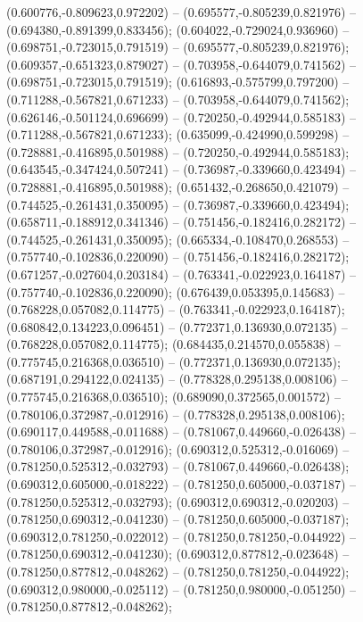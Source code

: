  (0.600776,-0.809623,0.972202) -- (0.695577,-0.805239,0.821976) -- (0.694380,-0.891399,0.833456);
 (0.604022,-0.729024,0.936960) -- (0.698751,-0.723015,0.791519) -- (0.695577,-0.805239,0.821976);
 (0.609357,-0.651323,0.879027) -- (0.703958,-0.644079,0.741562) -- (0.698751,-0.723015,0.791519);
 (0.616893,-0.575799,0.797200) -- (0.711288,-0.567821,0.671233) -- (0.703958,-0.644079,0.741562);
 (0.626146,-0.501124,0.696699) -- (0.720250,-0.492944,0.585183) -- (0.711288,-0.567821,0.671233);
 (0.635099,-0.424990,0.599298) -- (0.728881,-0.416895,0.501988) -- (0.720250,-0.492944,0.585183);
 (0.643545,-0.347424,0.507241) -- (0.736987,-0.339660,0.423494) -- (0.728881,-0.416895,0.501988);
 (0.651432,-0.268650,0.421079) -- (0.744525,-0.261431,0.350095) -- (0.736987,-0.339660,0.423494);
 (0.658711,-0.188912,0.341346) -- (0.751456,-0.182416,0.282172) -- (0.744525,-0.261431,0.350095);
 (0.665334,-0.108470,0.268553) -- (0.757740,-0.102836,0.220090) -- (0.751456,-0.182416,0.282172);
 (0.671257,-0.027604,0.203184) -- (0.763341,-0.022923,0.164187) -- (0.757740,-0.102836,0.220090);
 (0.676439,0.053395,0.145683) -- (0.768228,0.057082,0.114775) -- (0.763341,-0.022923,0.164187);
 (0.680842,0.134223,0.096451) -- (0.772371,0.136930,0.072135) -- (0.768228,0.057082,0.114775);
 (0.684435,0.214570,0.055838) -- (0.775745,0.216368,0.036510) -- (0.772371,0.136930,0.072135);
 (0.687191,0.294122,0.024135) -- (0.778328,0.295138,0.008106) -- (0.775745,0.216368,0.036510);
 (0.689090,0.372565,0.001572) -- (0.780106,0.372987,-0.012916) -- (0.778328,0.295138,0.008106);
 (0.690117,0.449588,-0.011688) -- (0.781067,0.449660,-0.026438) -- (0.780106,0.372987,-0.012916);
 (0.690312,0.525312,-0.016069) -- (0.781250,0.525312,-0.032793) -- (0.781067,0.449660,-0.026438);
 (0.690312,0.605000,-0.018222) -- (0.781250,0.605000,-0.037187) -- (0.781250,0.525312,-0.032793);
 (0.690312,0.690312,-0.020203) -- (0.781250,0.690312,-0.041230) -- (0.781250,0.605000,-0.037187);
 (0.690312,0.781250,-0.022012) -- (0.781250,0.781250,-0.044922) -- (0.781250,0.690312,-0.041230);
 (0.690312,0.877812,-0.023648) -- (0.781250,0.877812,-0.048262) -- (0.781250,0.781250,-0.044922);
 (0.690312,0.980000,-0.025112) -- (0.781250,0.980000,-0.051250) -- (0.781250,0.877812,-0.048262);
